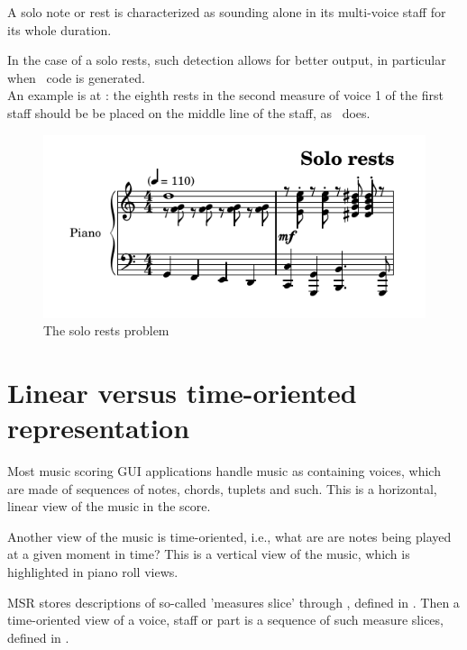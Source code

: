 A solo note or rest is characterized as sounding alone in its multi-voice staff for its whole duration.

In the case of a solo rests, such detection allows for better output, in particular when \lily\ code is generated.\\
An example is at  : the eighth rests in the second measure of voice 1 of the first staff should be be placed on the middle line of the staff, as \mscore\ does.
\begin{figure}[htbp]
\begin{center}
\includegraphics{../graphics/TheSoloRestsProblem.png}

\caption{The solo rests problem}
\label{The solo rests problem}
\end{center}
\end{figure}


\section{Linear versus time-oriented representation}\label{Linear versus time-oriented representation}

Most music scoring GUI applications handle music as containing voices, which are made of sequences of notes, chords, tuplets and such. This is a horizontal, linear view of the music in the score.

Another view of the music is time-oriented, i.e., what are are notes being played at a given moment in time? This is a vertical view of the music, which is highlighted in piano roll views.

MSR stores descriptions of so-called 'measures slice' through , defined in . Then a time-oriented view of a voice, staff or part is a sequence of such measure slices, defined in .%

